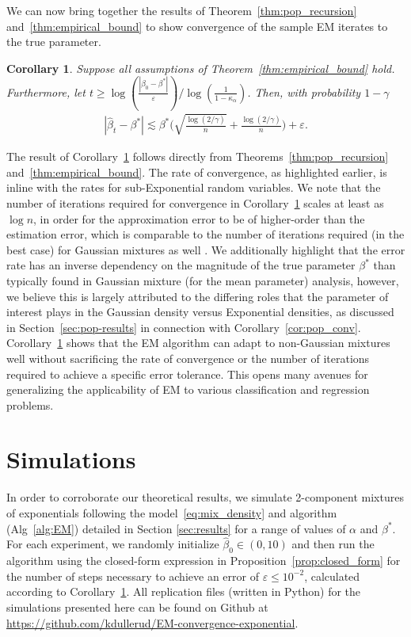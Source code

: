 \documentclass[runningheads]{llncs}
\newtheorem{cor}[theorem]{Corollary}
\begin{document}
We can now bring together the results of Theorem~\ref{thm:pop_recursion}
and~\ref{thm:empirical_bound} to show convergence of the sample EM
iterates to the true parameter.
\begin{cor}\label{cor:empirical_rate}
  Suppose all assumptions of Theorem~\ref{thm:empirical_bound} hold.
  Furthermore, let
  $t \geq \log(\frac{|\beta_0-\beta^*|}{\varepsilon})/\log (\frac{1}{1-\kappa_{\alpha}})$.
  Then, with probability $1-\gamma$
  \begin{align*}
    |\hat{\beta}_{t} - \beta^*|
    \lesssim
    \beta^*
    \Big(\sqrt{\frac{\log(2/ \gamma)}{n}}
    + \frac{\log(2/ \gamma)}{n}\Big)
    +\varepsilon.
  \end{align*}
\end{cor}
The result of Corollary~\ref{cor:empirical_rate} follows directly from
Theorems~\ref{thm:pop_recursion} and~\ref{thm:empirical_bound}. The rate of
convergence, as highlighted earlier, is inline with the rates for
sub-Exponential random variables.
We note that the number of iterations required for convergence in
Corollary~\ref{cor:empirical_rate} scales at least as $\log n$, in order for the
approximation error to be of higher-order than the estimation error, which
is comparable to the number of iterations required (in the best case) for Gaussian
mixtures as well \cite{wu2019randomly, xu2016global}. We additionally highlight that
the error rate has an inverse dependency on the magnitude of the true parameter
$\beta^*$ than typically found in Gaussian mixture (for the mean parameter)
analysis, however, we believe this is largely attributed to the differing roles
that the parameter of interest plays in the Gaussian density versus Exponential
densities, as discussed in Section~\ref{sec:pop-results} in connection with
Corollary~\ref{cor:pop_conv}.
Corollary~\ref{cor:empirical_rate} shows that the EM algorithm can adapt to
non-Gaussian mixtures well without sacrificing the rate of convergence or the
number of iterations required to achieve a specific error tolerance. This opens
many avenues for generalizing the applicability of EM to various classification
and regression problems.

\section{Simulations}\label{sec:sims}

In order to corroborate our theoretical results, we simulate 2-component
mixtures of exponentials following the model~\eqref{eq:mix_density} and
algorithm (Alg~\ref{alg:EM}) detailed in Section \ref{sec:results} for a range
of values of $\alpha$ and $\beta^*$.
For each experiment, we randomly initialize $\hat{\beta}_0 \in (0,10)$ and then
run the algorithm using the closed-form expression in
Proposition~\ref{prop:closed_form} for the number of steps necessary to achieve
an error of $\varepsilon \leq 10^{-2}$, calculated according to
Corollary~\ref{cor:empirical_rate}.
All replication files (written in Python) for the simulations presented here can
be found on Github at
\url{https://github.com/kdullerud/EM-convergence-exponential}.
\end{document}
